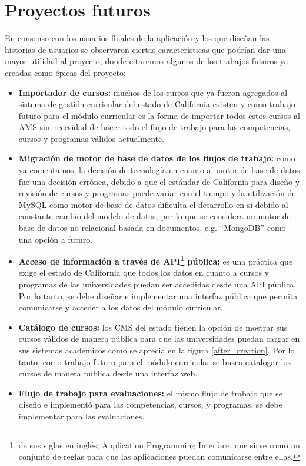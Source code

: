 \section{Proyectos futuros}
En consenso con los usuarios finales de la aplicación y los que diseñan las historias de usuarios se observaron ciertas características que podrían dar una mayor utilidad al proyecto, donde citaremos algunos de los trabajos futuros ya creadas como épicas del proyecto:
\begin{itemize}
	\item \textbf{Importador de cursos:} muchos de los cursos que ya fueron agregados al sistema de gestión curricular del estado de California existen y como trabajo futuro para el módulo curricular es la forma de importar todos estos cursos al AMS sin necesidad de hacer todo el flujo de trabajo para las competencias, cursos y programas válidos actualmente.
	\item \textbf{Migración de motor de base de datos de los flujos de trabajo:} como ya comentamos, la decisión de tecnología en cuanto al motor de base de datos fue una decisión errónea, debido a que el estándar de California para diseño y revisión de cursos y programas puede variar con el tiempo y la utilización de MySQL como motor de base de datos dificulta el desarrollo en sí debido al constante cambio del modelo de datos, por lo que se considera un motor de base de datos no relacional basada en documentos, e.g. \enquote{MongoDB} como una opción a futuro.
	\item \textbf{Acceso de información a través de API\footnote{de sus siglas en inglés, Application Programming Interface, que sirve como un conjunto de reglas para que las aplicaciones puedan comunicarse entre ellas.} pública:} es una práctica que exige el estado de California que todos los datos en cuanto a cursos y programas de las universidades puedan ser accedidas desde una API pública. Por lo tanto, se debe diseñar e implementar una interfaz pública que permita comunicarse y acceder a los datos del módulo curricular.
	\item \textbf{Catálogo de cursos:} los CMS del estado tienen la opción de mostrar sus cursos válidos de manera pública para que las universidades puedan cargar en sus sistemas académicos como se aprecia en la figura \ref{after_creation}. Por lo tanto, como trabajo futuro para el módulo curricular se busca catalogar los cursos de manera pública desde una interfaz web.
	\item \textbf{Flujo de trabajo para evaluaciones:} el mismo flujo de trabajo que se diseño e implementó para las competencias, cursos, y programas, se debe implementar para las evaluaciones.
\end{itemize}